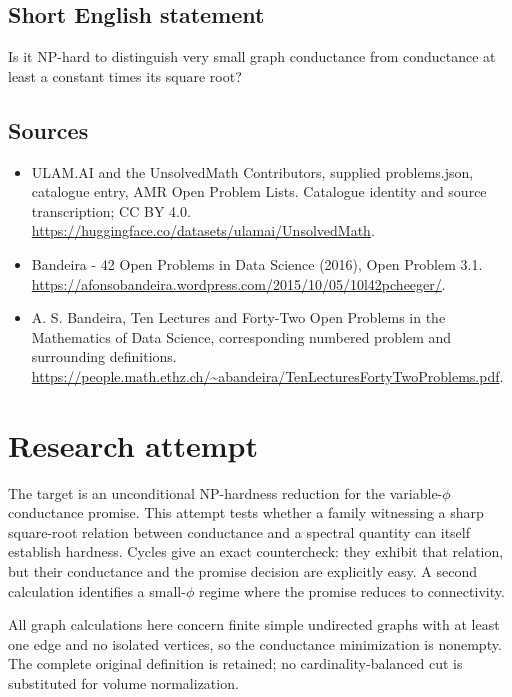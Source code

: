 \documentclass[11pt,a4paper]{article}
\begin{document}
\subsection{Short English statement}
Is it NP-hard to distinguish very small graph conductance from conductance at least a constant times its square root?
\subsection{Sources}
\begin{itemize}
\item[S1] ULAM.AI and the UnsolvedMath Contributors, supplied problems.json, catalogue entry, AMR Open Problem Lists. Catalogue identity and source transcription; CC BY 4.0.
\url{https://huggingface.co/datasets/ulamai/UnsolvedMath}.
\item[S2] Bandeira - 42 Open Problems in Data Science (2016), Open Problem 3.1. 
\url{https://afonsobandeira.wordpress.com/2015/10/05/10l42pcheeger/}.
\item[S3] A. S. Bandeira, Ten Lectures and Forty-Two Open Problems in the Mathematics of Data Science, corresponding numbered problem and surrounding definitions.
\url{https://people.math.ethz.ch/~abandeira/TenLecturesFortyTwoProblems.pdf}.
\end{itemize}


\section{Research attempt}
The target is an unconditional NP-hardness reduction for the variable-$\phi$ conductance promise. This attempt tests whether a family witnessing a sharp square-root relation between conductance and a spectral quantity can itself establish hardness. Cycles give an exact countercheck: they exhibit that relation, but their conductance and the promise decision are explicitly easy. A second calculation identifies a small-$\phi$ regime where the promise reduces to connectivity.

All graph calculations here concern finite simple undirected graphs with at least one edge and no isolated vertices, so the conductance minimization is nonempty. The complete original definition is retained; no cardinality-balanced cut is substituted for volume normalization.
\end{document}
